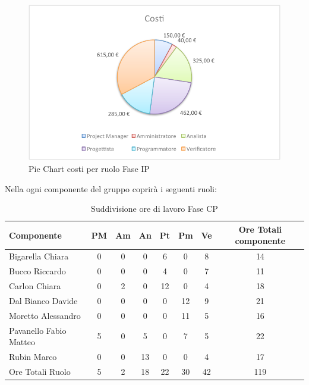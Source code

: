 				\begin{figure}[H]\centering
					\includegraphics[width=\textwidth]{PianoDiProgetto/Pics/ChartTotCostiFaseIP.pdf}
					\caption{Pie Chart costi per ruolo Fase IP}
				\end{figure}
				Nella  ogni componente del gruppo \groupname{} coprirà i seguenti ruoli:
				\begin{table}[H]
					\begin{center}
						\begin{tabular}{| l | c | c | c | c | c | c | c |}
							\hline
							Componente 					& PM	& Am 	& An 	& Pt 		& Pm 	& Ve 		& Ore Totali componente \\ \hline
							
							Bigarella Chiara 			& 0		& 0		& 0		& 6 		& 0		& 8 		& 14 \\
							Bucco Riccardo 				& 0		& 0		& 0		& 4 		& 0		& 7 		& 11 \\
							Carlon Chiara	 			& 0		& 2 	& 0		& 12 		& 0		& 4 		& 18 \\
							Dal Bianco Davide 			& 0		& 0		& 0		& 0			& 12 	& 9 		& 21 \\
							Moretto Alessandro 			& 0		& 0		& 0		& 0			& 11 	& 5			& 16 \\
							Pavanello Fabio Matteo	 	& 5 	& 0		& 5		& 0			& 7 	& 5 		& 22 \\
							Rubin Marco					& 0		& 0		& 13 	& 0			& 0		& 4 		& 17 \\ \hline \hline
							
							Ore Totali Ruolo 			& 5 	& 2 	& 18 	& 22 		& 30 	& 42 		& 119\\ \hline
						\end{tabular}
					\end{center}
					\caption{Suddivisione ore di lavoro Fase CP}
				\end{table}

